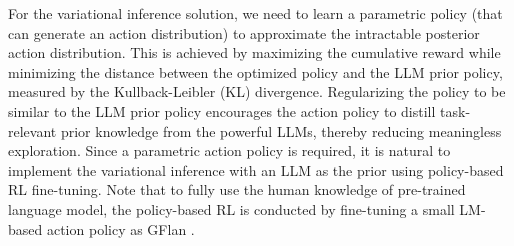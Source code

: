 \documentclass{article} %
\theoremstyle{plain}
\theoremstyle{definition}
\theoremstyle{remark}
\begin{document}
For the variational inference solution, we need to learn a parametric policy (that can generate an action distribution) to approximate the intractable posterior action distribution. This is achieved by maximizing the cumulative reward while minimizing the distance between the optimized policy and the LLM prior policy, measured by the Kullback-Leibler (KL) divergence. Regularizing the policy to be similar to the LLM prior policy encourages the action policy to distill task-relevant prior knowledge from the powerful LLMs, thereby reducing meaningless exploration. Since a parametric action policy is required, it is natural to implement the variational inference with an LLM as the prior using policy-based RL fine-tuning. Note that to fully use the human knowledge of pre-trained language model\citep{zhou2024reflect,tantrue}, the policy-based RL is conducted by fine-tuning a small LM-based action policy as GFlan \citep{carta2023grounding}.




\end{document}
